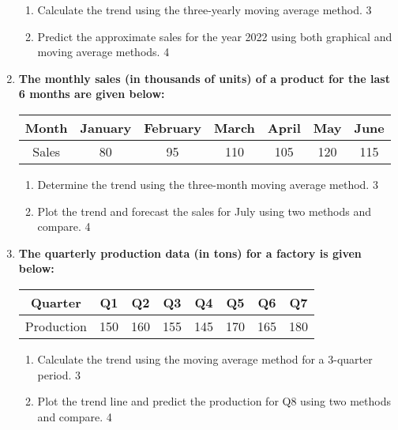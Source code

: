 \documentclass[a4paper,oneside]{book}
\begin{document}
\begin{enumerate}
\begin{enumerate}
    \item  
    Calculate the trend using the three-yearly moving average method. \hfill 3
    \item
    Predict the approximate sales for the year 2022 using both graphical and moving average methods. \hfill 4
\end{enumerate}
  
  \item
\textbf{The monthly sales (in thousands of units) of a product for the last 6 months are given below:}

\begin{table}[h]
\centering
\begin{tabular}{ccccccc}
Month     & January & February & March & April & May & June \\ \hline
Sales     & 80      & 95       & 110   & 105   & 120  & 115  \\
\end{tabular}
\end{table}

\begin{enumerate}
\item
Determine the trend using the three-month moving average method. \hfill 3
\item
Plot the trend and forecast the sales for July using two methods 
and compare. \hfill 4
\end{enumerate}

\item
\textbf{The quarterly production data (in tons) for a factory is given below:}

\begin{table}[h]
\centering
\begin{tabular}{cccccccc}
Quarter    & Q1     & Q2     & Q3     & Q4     & Q5     & Q6     & Q7     \\ \hline
Production & 150    & 160    & 155    & 145    & 170    & 165    & 180    \\
\end{tabular}
\end{table}

\begin{enumerate}
\item
Calculate the trend using the moving average method for a 3-quarter period. \hfill 3
\item
Plot the trend line and predict the production for Q8 using two methods 
and compare. \hfill 4
\end{enumerate}



\end{enumerate}
\end{document}
